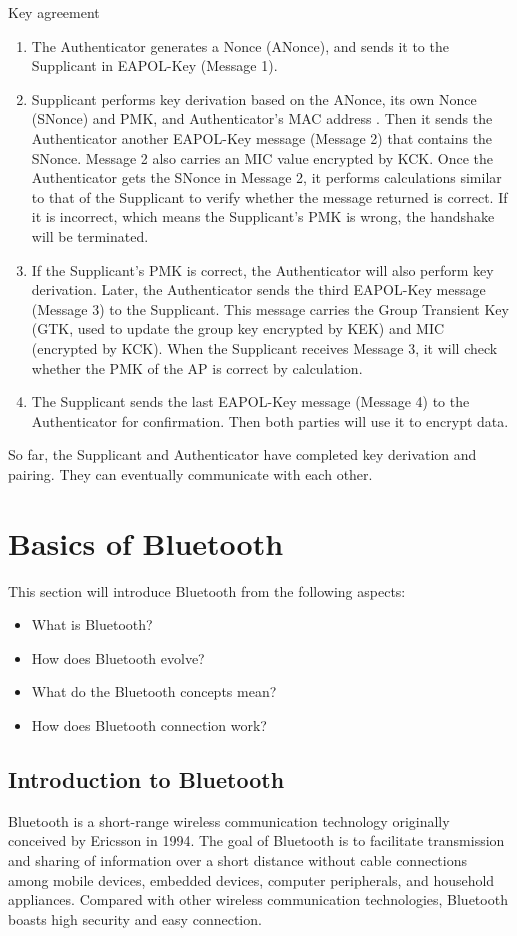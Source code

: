 \documentclass[a4paper,12pt]{book}
\begin{document}
\begin{term}{Key agreement}
    \begin{enumerate}[label=(\arabic*)]
        \item The Authenticator generates a Nonce (ANonce), and sends it to the Supplicant in EAPOL-Key (Message 1).
        \item Supplicant performs key derivation based on the ANonce, its own Nonce (SNonce) and PMK, and Authenticator's MAC address . Then it sends the Authenticator another EAPOL-Key message (Message 2) that contains the SNonce. Message 2 also carries an MIC value encrypted by KCK. Once the Authenticator gets the SNonce in Message 2, it performs calculations similar to that of the Supplicant to verify whether the message returned is correct. If it is incorrect, which means the Supplicant’s PMK is wrong, the handshake will be terminated.
        \item If the Supplicant’s PMK is correct, the Authenticator will also perform key derivation. Later, the Authenticator sends the third EAPOL-Key message (Message 3) to the Supplicant. This message carries the Group Transient Key (GTK, used to update the group key encrypted by KEK) and MIC (encrypted by KCK). When the Supplicant receives Message 3, it will check whether the PMK of the AP is correct by calculation.
        \item The Supplicant sends the last EAPOL-Key message (Message 4) to the Authenticator for confirmation. Then both parties will use it to encrypt data.
    \end{enumerate}

    So far, the Supplicant and Authenticator have completed key derivation and pairing. They can eventually communicate with each other.
\end{term}

\section{Basics of Bluetooth}
This section will introduce Bluetooth from the following aspects:

\begin{itemize}
    \item What is Bluetooth?
    \item How does Bluetooth evolve?
    \item What do the Bluetooth concepts mean?
    \item How does Bluetooth connection work?
\end{itemize}

\subsection{Introduction to Bluetooth}
Bluetooth is a short-range wireless communication technology originally conceived by Ericsson in 1994. The goal of Bluetooth is to facilitate transmission and sharing of information over a short distance without cable connections among mobile devices, embedded devices, computer peripherals, and household appliances. Compared with other wireless communication technologies, Bluetooth boasts high security and easy connection.
\end{document}
